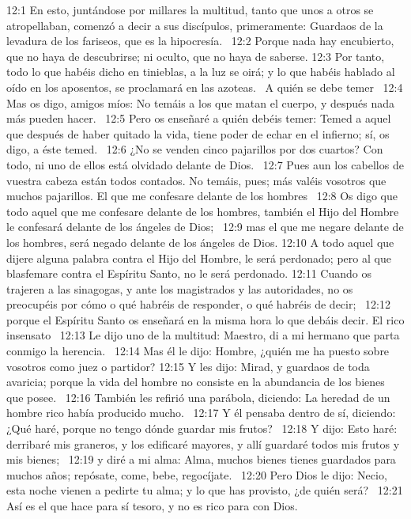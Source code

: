 12:1 En esto, juntándose por millares la multitud, tanto que unos a otros se atropellaban, comenzó a decir a sus discípulos, primeramente: Guardaos de la levadura de los fariseos, que es la hipocresía.  
12:2 Porque nada hay encubierto, que no haya de descubrirse; ni oculto, que no haya de saberse. 
12:3 Por tanto, todo lo que habéis dicho en tinieblas, a la luz se oirá; y lo que habéis hablado al oído en los aposentos, se proclamará en las azoteas.  
A quién se debe temer   
12:4 Mas os digo, amigos míos: No temáis a los que matan el cuerpo, y después nada más pueden hacer.  
12:5 Pero os enseñaré a quién debéis temer: Temed a aquel que después de haber quitado la vida, tiene poder de echar en el infierno; sí, os digo, a éste temed.  
12:6 ¿No se venden cinco pajarillos por dos cuartos? Con todo, ni uno de ellos está olvidado delante de Dios.  
12:7 Pues aun los cabellos de vuestra cabeza están todos contados. No temáis, pues; más valéis vosotros que muchos pajarillos. 
El que me confesare delante de los hombres  
12:8 Os digo que todo aquel que me confesare delante de los hombres, también el Hijo del Hombre le confesará delante de los ángeles de Dios;  
12:9 mas el que me negare delante de los hombres, será negado delante de los ángeles de Dios. 
12:10 A todo aquel que dijere alguna palabra contra el Hijo del Hombre, le será perdonado; pero al que blasfemare contra el Espíritu Santo, no le será perdonado. 
12:11 Cuando os trajeren a las sinagogas, y ante los magistrados y las autoridades, no os preocupéis por cómo o qué habréis de responder, o qué habréis de decir;  
12:12 porque el Espíritu Santo os enseñará en la misma hora lo que debáis decir. 
El rico insensato  
12:13 Le dijo uno de la multitud: Maestro, di a mi hermano que parta conmigo la herencia.  
12:14 Mas él le dijo: Hombre, ¿quién me ha puesto sobre vosotros como juez o partidor? 
12:15 Y les dijo: Mirad, y guardaos de toda avaricia; porque la vida del hombre no consiste en la abundancia de los bienes que posee.  
12:16 También les refirió una parábola, diciendo: La heredad de un hombre rico había producido mucho.  
12:17 Y él pensaba dentro de sí, diciendo: ¿Qué haré, porque no tengo dónde guardar mis frutos?  
12:18 Y dijo: Esto haré: derribaré mis graneros, y los edificaré mayores, y allí guardaré todos mis frutos y mis bienes;  
12:19 y diré a mi alma: Alma, muchos bienes tienes guardados para muchos años; repósate, come, bebe, regocíjate.  
12:20 Pero Dios le dijo: Necio, esta noche vienen a pedirte tu alma; y lo que has provisto, ¿de quién será?  
12:21 Así es el que hace para sí tesoro, y no es rico para con Dios.  
